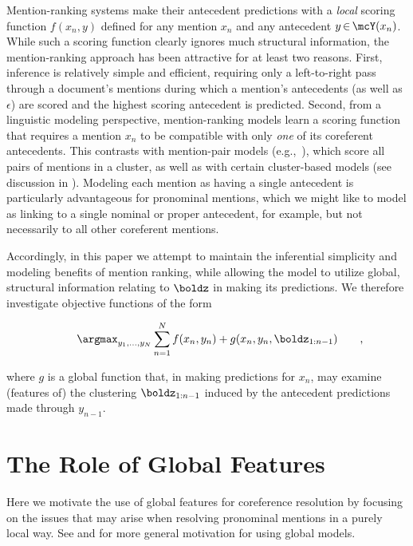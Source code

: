 \documentclass[11pt,letterpaper]{article}
\newcommand{\nicein}{\ensuremath{\,{\in}\,}}
\newcommand{\eqpunc}[1]{{\makebox[0pt][l]{\qquad\rm{#1}}}}
\begin{document}
Mention-ranking systems make their antecedent predictions with a \textit{local} scoring function $f(x_n, y)$ defined for any mention $x_n$ and any antecedent $y \nicein \mcY(x_n)$. While such a scoring function clearly ignores much structural information, the mention-ranking approach has been attractive for at least two reasons. First, inference is relatively simple and efficient, requiring only a left-to-right pass through a document's mentions during which a mention's antecedents (as well as $\epsilon$) are scored and the highest scoring antecedent is predicted. Second, from a linguistic modeling perspective, mention-ranking models learn a scoring function that requires a mention $x_n$ to be compatible with only \textit{one} of its coreferent antecedents. This contrasts with mention-pair models (e.g.,~), which score all pairs of mentions in a cluster, as well as with certain cluster-based models (see discussion in ). Modeling each mention as having a single antecedent is particularly advantageous for pronominal mentions, which we might like to model as linking to a single nominal or proper antecedent, for example, but not necessarily to all other coreferent mentions. 

Accordingly, in this paper we attempt to maintain the inferential simplicity and modeling benefits of mention ranking, while allowing the model to utilize global, structural information relating to $\boldz$ in making its predictions. We therefore investigate objective functions of the form 

\vspace{-5mm}
{\small
\begin{align*}
\argmax_{y_1, \ldots, y_N} \sum_{n=1}^N f(x_n, y_n) + g(x_n, y_n, \boldz_{1:n-1})\eqpunc{,}
\end{align*}
}

\vspace{-2mm}
\noindent where $g$ is a global function that, in making predictions for $x_n$, may examine (features of) the clustering $\boldz_{1:n-1}$ induced by the antecedent predictions made through $y_{n-1}$. 
 
\section{The Role of Global Features}
\label{sec:isglobalnecessary}
Here we motivate the use of global features for coreference resolution by focusing on the issues that may arise when resolving pronominal mentions in a purely local way. See  and  for more general motivation for using global models.
\end{document}
